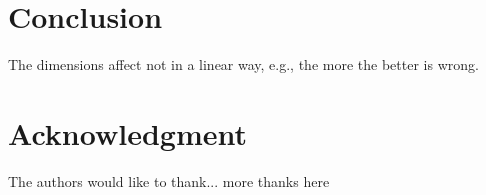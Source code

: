 \documentclass[10pt, conference, compsocconf]{IEEEtran}
\begin{document}
%





\section{Conclusion}

The dimensions affect not in a linear way, e.g., the more the better is wrong.



\section*{Acknowledgment}


The authors would like to thank...
more thanks here


\end{document}
